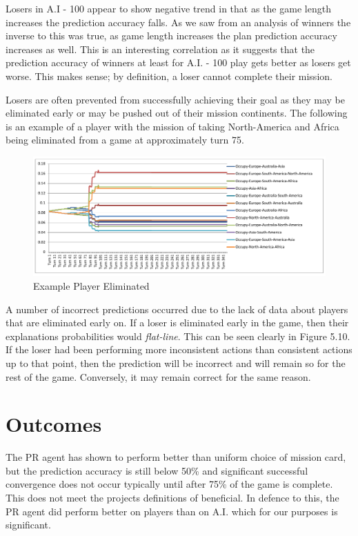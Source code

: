 \documentclass[parskip]{cs4rep}
\begin{document}
\newpage

Losers in A.I - 100 appear to show negative trend in that as the game length increases the prediction accuracy falls. As we saw from an analysis of winners the inverse to this was true, as game length increases the plan prediction accuracy increases as well. This is an interesting correlation as it suggests that the prediction accuracy of winners at least for A.I. - 100 play gets better as losers get worse. This makes sense; by definition, a loser cannot complete their mission. 

Losers are often prevented from successfully achieving their goal as they may be eliminated early or may be pushed out of their mission continents. The following is an example of a player with the mission of taking North-America and Africa being eliminated from a game at approximately turn 75.

\begin{figure}[h]
\centerline{
\includegraphics[width=1.1\textwidth]{images/player-elim-early.pdf}
}
\caption{Example Player Eliminated}
\label{fig:dom-debug-gui}
\end{figure}

\newpage

A number of incorrect predictions occurred due to the lack of data about players that are eliminated early on. If a loser is eliminated early in the game, then their explanations probabilities would \textit{flat-line}. This can be seen clearly in Figure 5.10. If the loser had been performing more inconsistent actions than consistent actions up to that point, then the prediction will be incorrect and will remain so for the rest of the game. Conversely, it may remain correct for the same reason.

\section{Outcomes}

The PR agent has shown to perform better than uniform choice of mission card, but the prediction accuracy is still below 50\% and significant successful convergence does not occur typically until after 75\% of the game is complete. This does not meet the projects definitions of beneficial. In defence to this, the PR agent did perform better on players than on A.I. which for our purposes is significant. 
\end{document}
